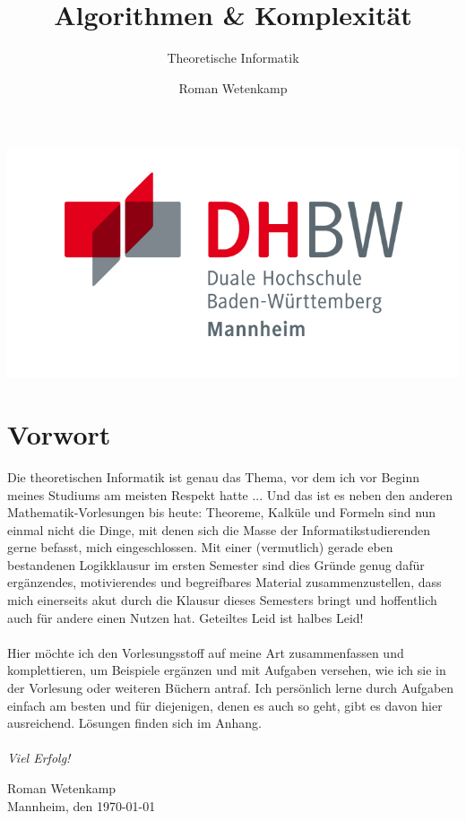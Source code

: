 \documentclass[11pt,a4paper]{scrartcl}
\author{Roman Wetenkamp}
\title{Algorithmen \& Komplexität}
\subtitle{Theoretische Informatik}
\begin{document}
\vspace{3cm}
\maketitle
\begin{center}
\includegraphics[scale=0.7]{DHBW.jpg}
\end{center}
\pagebreak
\tableofcontents
\pagebreak
\section*{Vorwort}
Die theoretischen Informatik ist genau das Thema, vor dem ich vor Beginn meines Studiums am meisten Respekt hatte ... Und das ist es neben den anderen Mathematik-Vorlesungen bis heute: Theoreme, Kalküle und Formeln sind nun einmal nicht die Dinge, mit denen sich die Masse der Informatikstudierenden gerne befasst, mich eingeschlossen. Mit einer (vermutlich) gerade eben bestandenen Logikklausur im ersten Semester sind dies Gründe genug dafür ergänzendes, motivierendes und begreifbares Material zusammenzustellen, dass mich einerseits akut durch die Klausur dieses Semesters bringt und hoffentlich auch für andere einen Nutzen hat. Geteiltes Leid ist halbes Leid! \\\\
Hier möchte ich den Vorlesungsstoff auf meine Art zusammenfassen und komplettieren, um Beispiele ergänzen und mit Aufgaben versehen, wie ich sie in der Vorlesung oder weiteren Büchern antraf. Ich persönlich lerne durch Aufgaben einfach am besten und für diejenigen, denen es auch so geht, gibt es davon hier ausreichend. Lösungen finden sich im Anhang. \\\\
\textit{Viel Erfolg!}  \\
\begin{flushright}
Roman Wetenkamp \\
Mannheim, den \today
\end{flushright}  
\pagebreak
\end{document}
